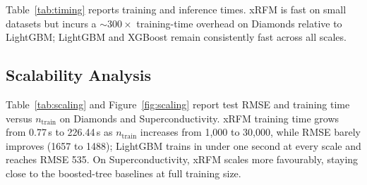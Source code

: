 Table~\ref{tab:timing} reports training and inference times.
xRFM is fast on small datasets but incurs a ${\sim}300\times$ training-time overhead on Diamonds
relative to LightGBM; LightGBM and XGBoost remain consistently fast across all scales.

\begin{table}[H]
  \centering
  \caption{Training time (s) and per-sample inference time ($\mu$s). Each cell: Train\,/\,Infer.}
  \label{tab:timing}
  \small
\end{table}

\subsection{Scalability Analysis}

Table~\ref{tab:scaling} and Figure~\ref{fig:scaling} report test RMSE and training time versus
$n_\text{train}$ on Diamonds and Superconductivity.
xRFM training time grows from 0.77\,s to 226.44\,s as $n_\text{train}$ increases from 1{,}000 to
30{,}000, while RMSE barely improves (1657 to 1488); LightGBM trains in under one second at every
scale and reaches RMSE 535. On Superconductivity, xRFM scales more favourably, staying close to the
boosted-tree baselines at full training size.

